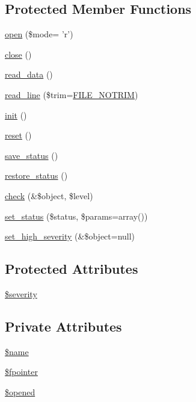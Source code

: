 \subsection*{Protected Member Functions}
\begin{DoxyCompactItemize}
\item 
\hyperlink{classFileHandler_a2a650b033c4eb1f98ba47fb05ce7b454}{open} (\$mode= 'r')
\item 
\hyperlink{classFileHandler_aa48e7c3b67346e29b194d2f0ac5dd1f8}{close} ()
\item 
\hyperlink{classFileHandler_a1389a6ea19a22471c301d70b5ed68ed8}{read\_\-data} ()
\item 
\hyperlink{classFileHandler_a69f84a8138f717c84f560125f1f95448}{read\_\-line} (\$trim=\hyperlink{class_8filehandler_8php_a3720f2e15eb9e16e29d8ecbb96763662}{FILE\_\-NOTRIM})
\item 
\hyperlink{class__OWL_ae0ef3ded56e8a6b34b6461e5a721cd3e}{init} ()
\item 
\hyperlink{class__OWL_a2f2a042bcf31965194c03033df0edc9b}{reset} ()
\item 
\hyperlink{class__OWL_a9e49b9c76fbc021b244c6915ea536d71}{save\_\-status} ()
\item 
\hyperlink{class__OWL_a465eeaf40edd9f9c848841700c32ce55}{restore\_\-status} ()
\item 
\hyperlink{class__OWL_ad6f4f6946f40199dd0333cf219fa500e}{check} (\&\$object, \$level)
\item 
\hyperlink{class__OWL_aea912d0ede9b3c2a69b79072d94d4787}{set\_\-status} (\$status, \$params=array())
\item 
\hyperlink{class__OWL_a576829692a3b66e3d518853bf43abae3}{set\_\-high\_\-severity} (\&\$object=null)
\end{DoxyCompactItemize}
\subsection*{Protected Attributes}
\begin{DoxyCompactItemize}
\item 
\hyperlink{class__OWL_ad26b40a9dbbacb33e299b17826f8327c}{\$severity}
\end{DoxyCompactItemize}
\subsection*{Private Attributes}
\begin{DoxyCompactItemize}
\item 
\hyperlink{classImageHandler_a517b3d7ff8643cca1dc2080523bfe2d6}{\$name}
\item 
\hyperlink{classImageHandler_ac56acda82f7ece75d33f6c57845a727e}{\$fpointer}
\item 
\hyperlink{classImageHandler_a6a87b3626bd0a457c6937b3e9b1cc69b}{\$opened}
\end{DoxyCompactItemize}


